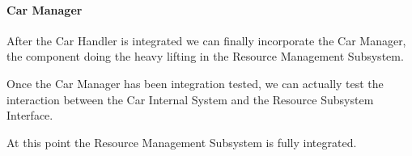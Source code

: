\documentclass[english]{article}
\begin{document}
\paragraph{Car Manager}
After the Car Handler is integrated we can finally incorporate the Car Manager, the component doing the heavy lifting in the Resource Management Subsystem.
\begin{figure}[H]
	\centering
\end{figure}

Once the Car Manager has been integration tested, we can actually test the interaction between the Car Internal System and the Resource Subsystem Interface.
\begin{figure}[H]
	\centering
\end{figure}

At this point the Resource Management Subsystem is fully integrated.
\begin{figure}[H]
	\centering
\end{figure}
\end{document}
